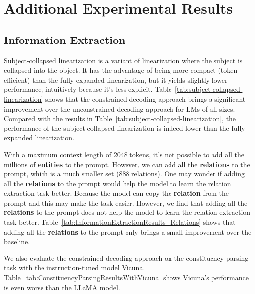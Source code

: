 \section{Additional Experimental Results}\label{app_sec:additional_experimental_results}
\subsection{Information Extraction}




Subject-collapsed linearization is a variant of linearization where the subject is collapsed into the object.
It has the advantage of being more compact (token efficient) than the fully-expanded linearization, but it yields slightly lower performance, intuitively because it's less explicit.
Table~\ref{tab:subject-collapsed-linearization} shows that the constrained decoding approach brings a significant improvement over the unconstrained decoding approach for LMs of all sizes.
%
Compared with the results in Table~\ref{tab:subject-collapsed-linearization}, the performance of the subject-collapsed linearization is indeed lower than the fully-expanded linearization.

With a maximum context length of 2048 tokens, it's not possible to add all the millions of \textbf{entities} to the prompt.
However, we can add all the \textbf{relations} to the prompt, which is a much smaller set (888 relations).
%
One may wonder if adding all the \textbf{relations} to the prompt would help the model to learn the relation extraction task better.
Because the model can copy the \textbf{relation} from the prompt and this may make the task easier.
However, we find that adding all the \textbf{relations} to the prompt does not help the model to learn the relation extraction task better.
Table~\ref{tab:InformationExtractionResults_Relations} shows that adding all the \textbf{relations} to the prompt only brings a small improvement over the baseline.




We also evaluate the constrained decoding approach on the constituency parsing task with the instruction-tuned model Vicuna.
Table~\ref{tab:ConstituencyParsingResultsWithVicuna} shows Vicuna's performance is even worse than the LLaMA model.



